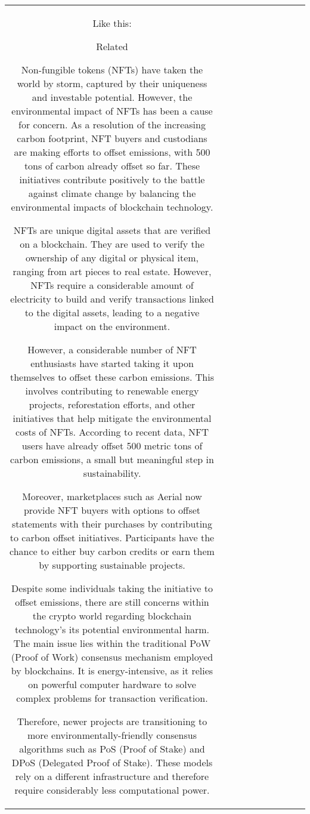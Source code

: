 \begin{table}[h!]
\begin{tabular}{|c|c|c|c|c|c|c|c|c|c|}
Like this:

Related



Non-fungible tokens (NFTs) have taken the world by storm, captured by their uniqueness and investable potential. However, the environmental impact of NFTs has been a cause for concern. As a resolution of the increasing carbon footprint, NFT buyers and custodians are making efforts to offset emissions, with 500 tons of carbon already offset so far. These initiatives contribute positively to the battle against climate change by balancing the environmental impacts of blockchain technology.

NFTs are unique digital assets that are verified on a blockchain. They are used to verify the ownership of any digital or physical item, ranging from art pieces to real estate. However, NFTs require a considerable amount of electricity to build and verify transactions linked to the digital assets, leading to a negative impact on the environment.

However, a considerable number of NFT enthusiasts have started taking it upon themselves to offset these carbon emissions. This involves contributing to renewable energy projects, reforestation efforts, and other initiatives that help mitigate the environmental costs of NFTs. According to recent data, NFT users have already offset 500 metric tons of carbon emissions, a small but meaningful step in sustainability.

Moreover, marketplaces such as Aerial now provide NFT buyers with options to offset statements with their purchases by contributing to carbon offset initiatives. Participants have the chance to either buy carbon credits or earn them by supporting sustainable projects.

Despite some individuals taking the initiative to offset emissions, there are still concerns within the crypto world regarding blockchain technology’s its potential environmental harm. The main issue lies within the traditional PoW (Proof of Work) consensus mechanism employed by blockchains. It is energy-intensive, as it relies on powerful computer hardware to solve complex problems for transaction verification.

Therefore, newer projects are transitioning to more environmentally-friendly consensus algorithms such as PoS (Proof of Stake) and DPoS (Delegated Proof of Stake). These models rely on a different infrastructure and therefore require considerably less computational power.


\end{tabular}
\end{table}
